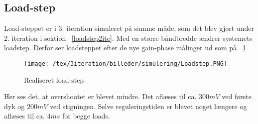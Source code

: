 \subsection{Load-step}
Load-steppet er i 3. iteration simuleret på samme måde, som det blev gjort under 2. iteration i sektion ~\ref{loadstep2ite}. Med en større båndbredde ændrer systemets loadstep. Derfor ser loadsteppet efter de nye gain-phase målinger ud som på ~\ref{fig:Loadstepsim2}
\begin{figure}[H]
	\center
	\texttt{[image: /tex/3iteration/billeder/simulering/Loadstep.PNG]}
	\caption{Realiseret load-step}
	\label{fig:Loadstepsim2}
\end{figure} 
Her ses det, at overshootet er blevet mindre. Det aflæses til ca. $300mV$ ved første dyk og $200mV$ ved stigningen. Selve reguleringstiden er blevet noget længere og aflæses til ca. $4ms$ for begge loads. 
